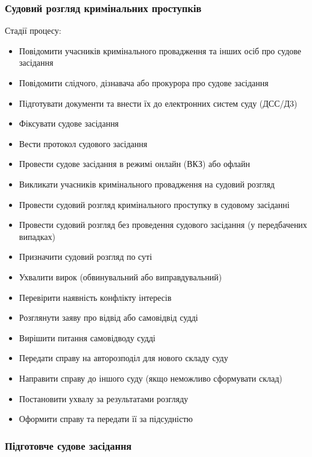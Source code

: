 \documentclass{article}
\begin{document}
\newpage
\subsubsection{Судовий розгляд кримінальних проступків}

Стадії процесу:

\begin{itemize}
    \item Повідомити учасників кримінального провадження та інших осіб про судове засідання
    \item Повідомити слідчого, дізнавача або прокурора про судове засідання
    \item Підготувати документи та внести їх до електронних систем суду (ДСС/Д3)
    \item Фіксувати судове засідання
    \item Вести протокол судового засідання
    \item Провести судове засідання в режимі онлайн (ВКЗ) або офлайн
    \item Викликати учасників кримінального провадження на судовий розгляд
    \item Провести судовий розгляд кримінального проступку в судовому засіданні
    \item Провести судовий розгляд без проведення судового засідання (у передбачених випадках)
    \item Призначити судовий розгляд по суті
    \item Ухвалити вирок (обвинувальний або виправдувальний)
    \item Перевірити наявність конфлікту інтересів
    \item Розглянути заяву про відвід або самовідвід судді
    \item Вирішити питання самовідводу судді
    \item Передати справу на авторозподіл для нового складу суду
    \item Направити справу до іншого суду (якщо неможливо сформувати склад)
    \item Постановити ухвалу за результатами розгляду
    \item Оформити справу та передати її за підсудністю
\end{itemize}

\newpage
\subsubsection{Підготовче судове засідання}
\end{document}
